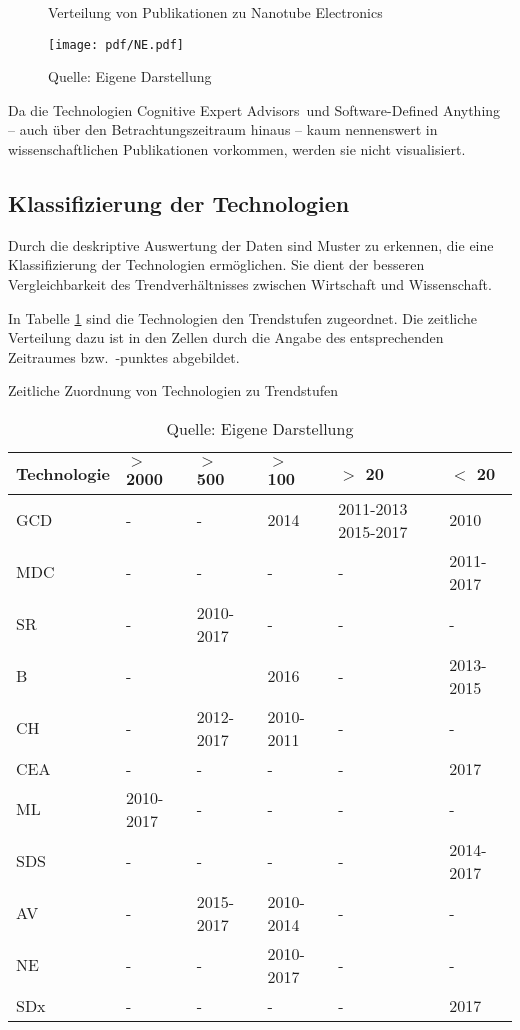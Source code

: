 \begin{figure}
	\centering
	\caption{Verteilung von Publikationen zu \glqq Nanotube Electronics\grqq}
	\texttt{[image: pdf/NE.pdf]}
	\caption*{Quelle: Eigene Darstellung}
	\label{fig:ne_pub}
\end{figure}

Da die Technologien \glqq Cognitive Expert Advisors\grqq~und \glqq Software-Defined Anything\grqq~ -- auch über den Betrachtungszeitraum hinaus -- kaum nennenswert in wissenschaftlichen Publikationen vorkommen, werden sie nicht visualisiert.

\subsection{Klassifizierung der Technologien}
Durch die deskriptive Auswertung der Daten sind Muster zu erkennen, die eine Klassifizierung der Technologien ermöglichen. Sie dient der besseren Vergleichbarkeit des Trendverhältnisses zwischen Wirtschaft und Wissenschaft.

In Tabelle \ref{tab:class_trend_ev} sind die Technologien den Trendstufen zugeordnet. Die zeitliche Verteilung dazu ist in den Zellen durch die Angabe des entsprechenden Zeitraumes bzw.~-punktes abgebildet.

\begin{table}
	\caption{Zeitliche Zuordnung von Technologien zu Trendstufen}
	\selectfont
	\footnotesize
	\centering
	\label{tab:class_trend_ev}
	\begin{tabularx}{\linewidth}{p{2.2cm}|XXXXX}
		Technologie & $>$ 2000 & $>$ 500 & $>$ 100 & $>$ 20 & $<$ 20 \\
		\hline
		\acs{GCD} & - & - & 2014 & 2011-2013 2015-2017 & 2010 \\
		\acs{MDC} & - & - & - & - & 2011-2017 \\
		\acs{SR} & - & 2010-2017 & - & - & - \\
		\acs{B} & - & & 2016 & - & 2013-2015 \\
		\acs{CH} & - & 2012-2017 & 2010-2011 & - & - \\
		\acs{CEA} & - & - & - & - & 2017 \\
		\acs{ML} & 2010-2017 & - & - & - & - \\
		\acs{SDS} & - & - & - & - & 2014-2017 \\
		\acs{AV} & - & 2015-2017 & 2010-2014 & - & - \\
		\acs{NE} & - & - & 2010-2017 & - & - \\
		\acs{SDx} & - & - & - & - & 2017 \\
		\hline
	\end{tabularx}
	\caption*{Quelle: Eigene Darstellung}
\end{table}

